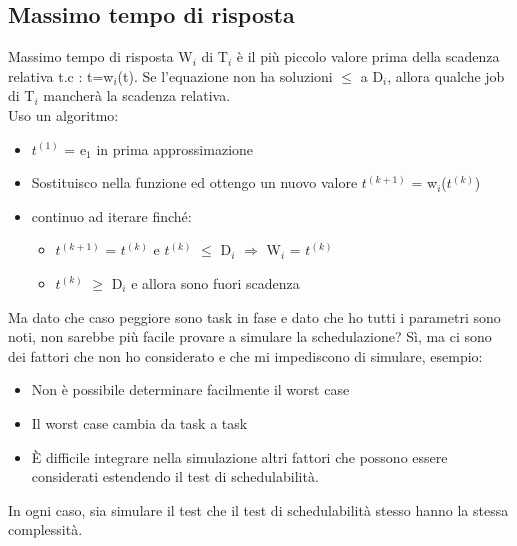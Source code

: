 \documentclass[12pt, oneside]{extbook}
\begin{document}
\subsection{Massimo tempo di risposta}
Massimo tempo di risposta W$_{i}$ di T$_{i}$ è il più piccolo valore prima della scadenza relativa t.c : t=w$_{i}$(t). Se l'equazione non ha soluzioni $\leq$ a D$_{i}$, allora qualche job di T$_{i}$ mancherà la scadenza relativa.\\ Uso un algoritmo:\\
\begin{itemize}
\item $t^(1)$ = e$_{1}$ in prima approssimazione
\item  Sostituisco nella funzione ed ottengo un nuovo valore $t^(k+1)$ = w$_{i}$($t^(k)$)
\item continuo ad iterare finché: 
\begin{itemize}
\item $t^(k+1)$ = $t^(k)$ e $t^(k)$ $\leq$ D$_{i}$ $\Rightarrow$ W$_{i}$ = $t^(k)$
\item $t^(k)$ $\geq$ D$_{i}$ e allora sono fuori scadenza
\end{itemize}
\end{itemize}
Ma dato che caso peggiore sono task in fase e dato che ho tutti i parametri sono noti, non sarebbe più facile provare a simulare la schedulazione? Sì, ma ci sono dei fattori che non ho considerato e che mi impediscono di simulare, esempio:
\begin{itemize}
\item Non è possibile determinare facilmente il worst case
\item Il worst case cambia da task a task
\item È difficile integrare nella simulazione altri fattori che possono essere considerati estendendo il test di schedulabilità.
\end{itemize}
In ogni caso, sia simulare il test che il test di schedulabilità stesso hanno la stessa complessità.
\end{document}
